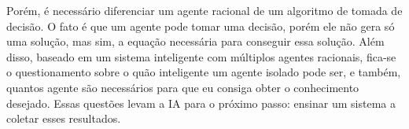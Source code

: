Porém, é necessário diferenciar um agente racional de um algoritmo de tomada de decisão. O fato é que um agente pode tomar uma decisão, porém ele não gera só uma solução, mas sim, a equação necessária para conseguir essa solução. Além disso, baseado em um sistema inteligente com múltiplos agentes racionais, fica-se o questionamento sobre o quão inteligente um agente isolado pode ser, e também, quantos agente são necessários para que eu consiga obter o conhecimento desejado. Essas questões levam a IA para o próximo passo: ensinar um sistema a coletar esses resultados.

